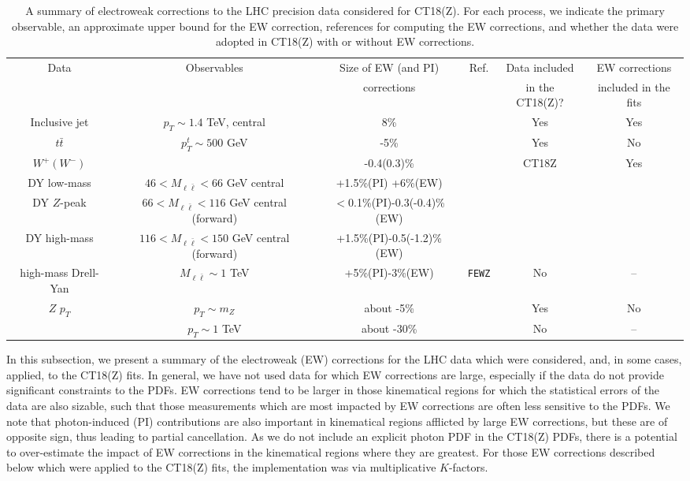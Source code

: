 \begin{table}
\caption{A summary of electroweak corrections to the LHC precision data considered for CT18(Z).  For each process, we indicate the primary observable, an approximate upper bound
for the EW correction, references for computing the EW corrections, and whether the data were adopted in CT18(Z) with or without EW corrections.}
\label{tab:EWcorrections}
\hspace*{-0.75cm}\begin{tabular}{c|c|c|c|c|c}
\hline
\multirow{2}{*}{Data} & \multirow{2}{*}{Observables}  & Size of EW (and PI)  & Ref. & Data included & EW corrections  \\
 &    & corrections & & in the CT18(Z)? & included in the fits\\
\hline
	Inclusive jet & $p_{T}\sim1.4$ TeV, central  & 8\%  & \cite{Dittmaier:2012kx} & Yes & Yes \\
\hline
	$t\bar{t}$ &$p_{T}^{t}\sim500$ GeV   &  -5\% & \cite{Czakon:2017wor} & Yes & No \\
\hline
$W^{+}(W^{-})$ &     & -0.4(0.3)\%  & \multirow{4}{*}{\cite{Aaboud:2016btc}} & \multirow{4}{*}{CT18Z} & \multirow{4}{*}{Yes}  \\
DY low-mass & $46<M_{\ell \bar \ell}<66$ GeV central  & +1.5\%(PI) +6\%(EW) &  &     \\
DY $Z$-peak  & $66<M_{\ell \bar \ell}<116$ GeV central (forward) & $<$0.1\%(PI)-0.3(-0.4)\%(EW)  & & \\
DY high-mass &$116<M_{\ell \bar \ell}<150$ GeV central (forward) & +1.5\%(PI)-0.5(-1.2)\% (EW) & & \\
\hline
high-mass Drell-Yan & $M_{\ell \bar \ell}\sim1$ TeV  & +5\%(PI)-3\%(EW)  & \texttt{FEWZ} & No  & -- \\
\hline
\multirow{2}{*}{$Z$ $p_{T}$} & $p_{T}\sim m_Z$ & about -5\%   & \cite{Kallweit:2015fta} & Yes & No \\
 & $p_{T}\sim1$ TeV & about -30\%   & \cite{Kallweit:2015fta} & No & --  \\
\hline
\end{tabular}
\end{table}

In this subsection, we present a  summary of the electroweak (EW) corrections for the LHC data which were considered, and,
in some cases, applied, to the CT18(Z) fits. In general, we have not used data for which EW corrections are large, especially
if the data do not provide significant constraints to the PDFs. EW corrections tend to be larger in those kinematical regions
for which the statistical errors of the data are also sizable, such that those measurements which are most impacted by EW corrections
are often less sensitive to the PDFs. We note that photon-induced (PI) contributions are also important in kinematical regions afflicted
by large EW corrections, but these are of opposite sign, thus leading to partial cancellation. As we do not include an explicit photon PDF 
in the CT18(Z) PDFs, there is a potential to over-estimate the impact of EW corrections in the kinematical regions where they are greatest. 
For those EW corrections described below which were applied to the CT18(Z) fits, the implementation
was via multiplicative $K$-factors.

